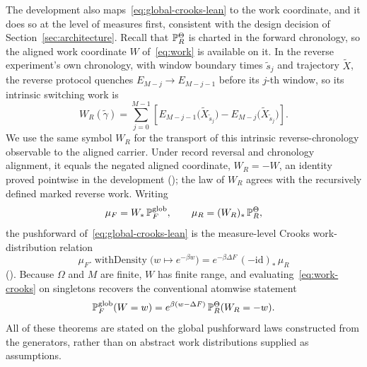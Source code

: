 The development also maps~\eqref{eq:global-crooks-lean} to the work coordinate, and it does so at the level of measures first, consistent with the design decision of Section~\ref{sec:architecture}. Recall that $\mathbb{P}_R^{\Theta}$ is charted in the forward chronology, so the aligned work coordinate $W$ of~\eqref{eq:work} is available on it. In the reverse experiment's own chronology, with window boundary times $\tilde s_j$ and trajectory $\tilde X$, the reverse protocol quenches $E_{M-j}\to E_{M-j-1}$ before its $j$-th window, so its intrinsic switching work is
\[
  W_R(\tilde\gamma)
  =\sum_{j=0}^{M-1}
  \left[
    E_{M-j-1}\bigl(\tilde X_{\tilde s_j}\bigr)
    -E_{M-j}\bigl(\tilde X_{\tilde s_j}\bigr)
  \right].
\]
We use the same symbol $W_R$ for the transport of this intrinsic reverse-chronology observable to the aligned carrier. Under record reversal and chronology alignment, it equals the negated aligned coordinate, $W_R=-W$, an identity proved pointwise in the development (); the law of $W_R$ agrees with the recursively defined marked reverse work. Writing
\[
  \mu_F=W_*\,\mathbb{P}_F^{\mathrm{glob}},
  \qquad
  \mu_R=(W_R)_*\,\mathbb{P}_R^{\Theta},
\]
the pushforward of~\eqref{eq:global-crooks-lean} is the measure-level Crooks work-distribution relation
\begin{equation}
\label{eq:work-crooks}
  \mu_F.\operatorname{withDensity}\bigl(w\mapsto e^{-\beta w}\bigr)
  = e^{-\beta\Delta F}\,(-\mathrm{id})_*\,\mu_R
\end{equation}
(). Because $\Omega$ and $M$ are finite, $W$ has finite range, and evaluating~\eqref{eq:work-crooks} on singletons recovers the conventional atomwise statement
\begin{equation}
\label{eq:atom-crooks}
  \mathbb{P}_F^{\mathrm{glob}}(W=w)
  =e^{\beta(w-\Delta F)}\,\mathbb{P}_R^{\Theta}(W_R=-w).
\end{equation}
All of these theorems are stated on the global pushforward laws constructed from the generators, rather than on abstract work distributions supplied as assumptions.
